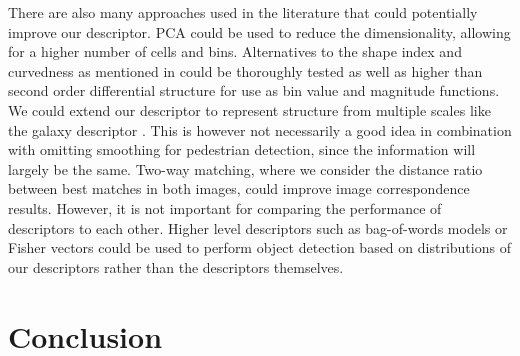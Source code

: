 \documentclass[thesis.tex]{subfiles}
\begin{document}
There are also many approaches used in the literature that could potentially improve our descriptor. PCA could be used to reduce the dimensionality, allowing for a higher number of cells and bins. Alternatives to the shape index and curvedness as mentioned in  could be thoroughly tested as well as higher than second order differential structure for use as bin value and magnitude functions. We could extend our descriptor to represent structure from multiple scales like the galaxy descriptor . This is however not necessarily a good idea in combination with omitting smoothing for pedestrian detection, since the information will largely be the same. Two-way matching, where we consider the distance ratio between best matches in both images, could improve image correspondence results. However, it is not important for comparing the performance of descriptors to each other. Higher level descriptors such as bag-of-words models or Fisher vectors \cite{sanchez2013image} could be used to perform object detection based on distributions of our descriptors rather than the descriptors themselves.

\section{Conclusion}

\subbibliography
\end{document}
